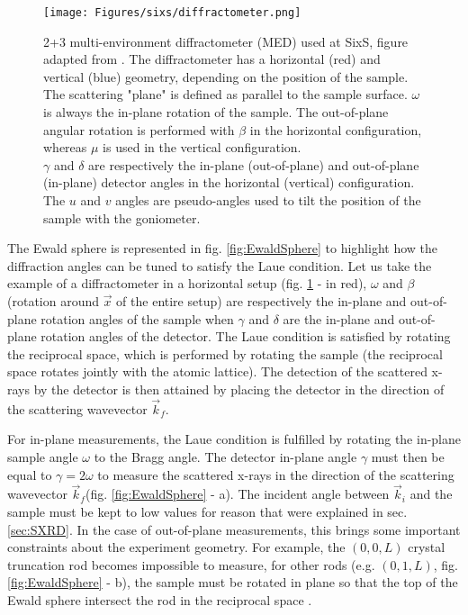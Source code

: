 \begin{figure}[!htb]
    \centering
    \texttt{[image: Figures/sixs/diffractometer.png]}
    \caption{
    2+3 multi-environment diffractometer (MED) used at SixS, figure adapted from \cite{Schleputz2011}.
    The diffractometer has a horizontal (red) and vertical (blue) geometry, depending on the position of the sample.\\
    The scattering "plane" is defined as parallel to the sample surface.
    $\omega$ is always the in-plane rotation of the sample.
    The out-of-plane angular rotation is performed with $\beta$ in the horizontal configuration, whereas $\mu$ is used in the vertical configuration.\\
    $\gamma$ and $\delta$ are respectively the in-plane (out-of-plane) and out-of-plane (in-plane) detector angles in the horizontal (vertical) configuration.\\
    The $u$ and $v$ angles are pseudo-angles used to tilt the position of the sample with the goniometer.
    }
    \label{fig:Diffractometer}
\end{figure}

The Ewald sphere is represented in fig. \ref{fig:EwaldSphere} to highlight how the diffraction angles can be tuned to satisfy the Laue condition.
Let us take the example of a diffractometer in a horizontal setup (fig. \ref{fig:Diffractometer} - in red), $\omega$ and $\beta$ (rotation around $\vec{x}$ of the entire setup) are respectively the in-plane and out-of-plane rotation angles of the sample when $\gamma$ and $\delta$ are the in-plane and out-of-plane rotation angles of the detector.
The Laue condition is satisfied by rotating the reciprocal space, which is performed by rotating the sample (the reciprocal space rotates jointly with the atomic lattice).
The detection of the scattered x-rays by the detector is then attained by placing the detector in the direction of the scattering wavevector $\vec{k}_f$.

For in-plane measurements, the Laue condition is fulfilled by rotating the in-plane sample angle $\omega$ to the Bragg angle.
The detector in-plane angle $\gamma$ must then be equal to $\gamma = 2 \omega$ to measure the scattered x-rays in the direction of the scattering wavevector $\vec{k}_f$(fig. \ref{fig:EwaldSphere} - a).
The incident angle between $\vec{k}_i$ and the sample must be kept to low values for reason that were explained in sec. \ref{sec:SXRD}.
In the case of out-of-plane measurements, this brings some important constraints about the experiment geometry.
For example, the $(0, 0, L)$ crystal truncation rod becomes impossible to measure, for other rods (e.g. $(0, 1, L)$, fig. \ref{fig:EwaldSphere} - b), the sample must be rotated in plane so that the top of the Ewald sphere intersect the rod in the reciprocal space \parencite{Vlieg1997, Schleputz2005}.

